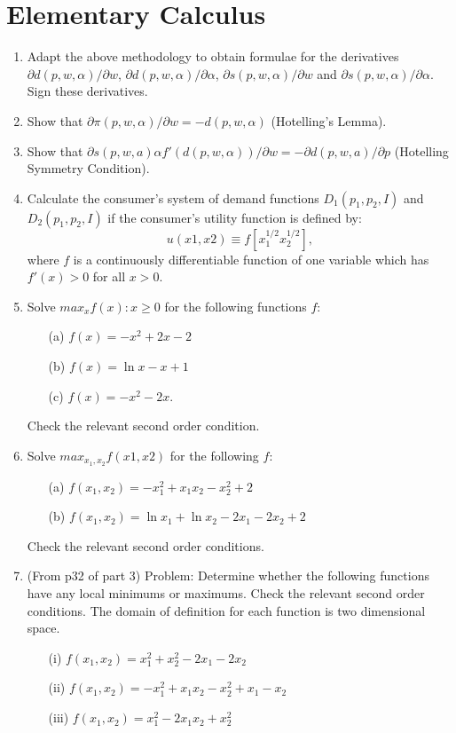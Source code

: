 \documentclass[10pt]{article}
\renewcommand{\textit}{}
\begin{document}
\section{Elementary Calculus}
\renewcommand{\labelenumi}{\arabic{enumi}}
\begin{enumerate}
\item \textit{Adapt the above methodology to obtain formulae for the
    derivatives $\partial d(p, w, \alpha)/\partial w$, $\partial d(p,
    w, \alpha)/\partial \alpha$, $\partial s(p, w, \alpha)/\partial w$
    and $\partial s(p, w, \alpha)/\partial \alpha$.  Sign these
    derivatives.}
\item \textit{Show that $\partial \pi(p, w, \alpha)/\partial w = -d(p,
    w, \alpha)$ (Hotelling's Lemma).}
\item\textit{Show that $\partial s(p, w, a)\alpha
    f'(d(p,w,\alpha))/\partial w = -\partial d(p, w, a)/\partial p$
    (Hotelling Symmetry Condition).} 
\item \textit{Calculate the consumer's system of demand functions
    $D_1(p_1, p_2, I)$ and $D_2 (p_1, p_2, I)$ if the consumer's
    utility function is defined by:}
    \[  u(x1, x2) ≡ f[x_1^{1/2} x_2^{1/2} ], \]  
    \textit{where $f$ is a continuously differentiable function of one
    variable which has $f'(x) > 0$ for all $x > 0$.}
\item \textit{Solve $max_x {f(x):  x ≥ 0}$ for the following functions
    $f$:}
    \begin{itemize}
    \item[(a)] $f(x) = -x^2 + 2x - 2$
    \item[(b)] $f(x) = \ln x - x + 1$
    \item[(c)] $f(x) = -x^2 - 2x$.
    \end{itemize}
    \textit{Check the relevant second order condition.} 
  \item \textit{Solve $max_{x_1, x_2} f(x1, x2)$ for the following $f$:}
    \begin{itemize}
    \item[(a)]  $f(x_1, x_2) = -x_1^2 + x_1 x_2 - x_2^2 + 2$
    \item[(b)] $f(x_1, x_2) = \ln x_1 + \ln x_2 - 2x_1 - 2x_2 + 2$
    \end{itemize}
    \textit{Check the relevant second order conditions.}
  \item \textit{(From p32 of part 3) Problem: Determine whether the
      following functions have any local minimums or maximums.  Check
      the relevant second order conditions.  The domain of definition
      for each function is two dimensional space. }
  \begin{itemize}
  \item[(i)]  $f(x_1,x_2) =  x_1^2 + x_2^2 -2 x_1 - 2x_2 $
  \item[(ii)]  $f(x_1,x_2) =  - x_1^2 + x_1 x_2 -x_2^2 + x_1 - x_2$
  \item[(iii)] $f(x_1,x_2) = x_1^2 - 2x_1 x_2 + x_2^2$
  \end{itemize}
\end{enumerate}
\end{document}
